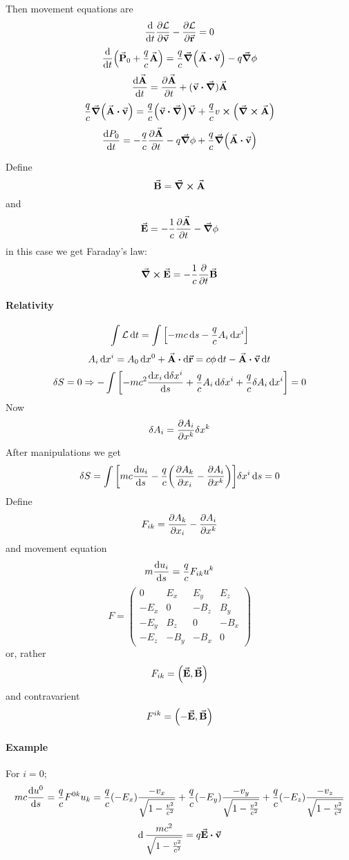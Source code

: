 Then movement equations are
$$\dv{t} \pdv{\mathcal{L}}{\va{v}} - \pdv{\mathcal{L}}{\va{r}} = 0$$
$$\dv{t} \qty(\va{P}_0+\frac{q}{c}\va{A}) = \frac{q}{c} \grad(\va{A} \vdot \va{v}) - q\grad{\phi}$$
$$\dv{\va{A}}{t} = \pdv{\va{A}}{t} + (\va{v} \vdot \grad)\va{A}$$
$$\frac{q}{c}\grad(\va{A} \vdot \va{v}) = \frac{q}{c} \qty(\va{v} \vdot \grad) \va{V} + \frac{q}{c} v \cross \qty(\curl{\va{A}})$$
$$\dv{P_0}{t} = -\frac{q}{c} \pdv{\va{A}}{t} - q\grad{\phi} + \frac{q}{c} \grad(\va{A} \vdot \va{v})$$

Define
$$\va{B} = \curl{\va{A}}$$
and
$$\va{E} = -\frac{1}{c} \pdv{\va{A}}{t} - \grad{\phi}$$
in this case we get Faraday's law:
$$\curl{\va{E}} = -\frac{1}{c} \pdv{t} \va{B}$$
\paragraph{Relativity}
$$\int \mathcal{L} \dd{t} = \int \qty[-mc\dd{s} -\frac{q}{c} A_i \dd{x^i}]$$
$$A_i\dd{x^i} =A_0\dd{x^0} + \va{A} \vdot \dd{\va{r}} = c\phi \dd{t} - \va{A} \vdot \va{v}\dd{t} $$
$$\delta S = 0 \Rightarrow -\int \qty[-mc^2 \frac{\dd{x_i}\dd{\delta x^i}}{\dd{s}} + \frac{q}{c} A_i \dd{\delta x^i} + \frac{q}{c} \delta A_i \dd{x^i}] = 0$$
Now
$$\delta A_i = \pdv{A_i}{x^k}\delta x^k$$
After manipulations we get
$$\delta S = \int \qty[mc\dv{u_i}{s} - \frac{q}{c}\qty(\pdv{A_k}{x_i} - \pdv{A_i}{x^k})] \delta x^i \dd{s} = 0$$
Define
$$F_{ik} = \pdv{A_k}{x_i} - \pdv{A_i}{x^k} $$
and movement equation 
$$m\dv{u_i}{s} = \frac{q}{c} F_{ik} u^k$$
$$F = \begin{pmatrix}
0&E_x&E_y&E_z\\
-E_x&0&-B_z&B_y\\
-E_y&B_z&0&-B_x\\
-E_z&-B_y&-B_x&0
\end{pmatrix}$$
or, rather
$$F_{ik} = \qty(\va{E}, \va{B})$$
and contravarient
$$F^{ik} = \qty(-\va{E}, \va{B})$$
\paragraph{Example}
For $i=0$;
$$mc \dv{u^0}{s} = \frac{q}{c} F^{0k}u_k = \frac{q}{c} (-E_x)\frac{-v_x}{\sqrt{1-\frac{v^2}{c^2}}}+\frac{q}{c} (-E_y)\frac{-v_y}{\sqrt{1-\frac{v^2}{c^2}}}+\frac{q}{c} (-E_z)\frac{-v_z}{\sqrt{1-\frac{v^2}{c^2}}}$$
$$\dd{} \frac{mc^2}{\sqrt{1-\frac{v^2}{c^2}}} = q \va{E} \vdot \va{v}$$